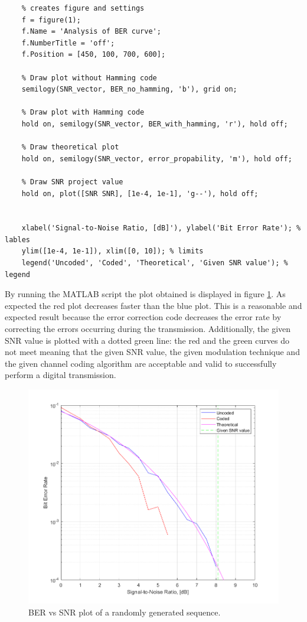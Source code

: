 \begin{lstlisting}
    % creates figure and settings
    f = figure(1);
    f.Name = 'Analysis of BER curve';
    f.NumberTitle = 'off';
    f.Position = [450, 100, 700, 600];
    
    % Draw plot without Hamming code
    semilogy(SNR_vector, BER_no_hamming, 'b'), grid on;

    % Draw plot with Hamming code
    hold on, semilogy(SNR_vector, BER_with_hamming, 'r'), hold off;

    % Draw theoretical plot
    hold on, semilogy(SNR_vector, error_propability, 'm'), hold off;

    % Draw SNR project value
    hold on, plot([SNR SNR], [1e-4, 1e-1], 'g--'), hold off;

    
    xlabel('Signal-to-Noise Ratio, [dB]'), ylabel('Bit Error Rate'); % lables
    ylim([1e-4, 1e-1]), xlim([0, 10]); % limits
    legend('Uncoded', 'Coded', 'Theoretical', 'Given SNR value'); % legend
\end{lstlisting}

\noindent By running the MATLAB script the plot obtained is displayed in figure \ref{fig:BER-plot}. As expected the red plot decreases faster than the blue plot. This is a reasonable and expected result because the error correction code decreases the error rate by correcting the errors occurring during the transmission. Additionally, the given SNR value is plotted with a dotted green line: the red and the green curves do not meet meaning that the given SNR value, the given modulation technique and the given channel coding algorithm are acceptable and valid to successfully perform a digital transmission. 

\begin{figure}[h]
    \centering
    \includegraphics[width = \textwidth]{../res/imgs/BER-plot.png}
    \caption{BER vs SNR plot of a randomly generated sequence.}
    \label{fig:BER-plot}
\end{figure}

